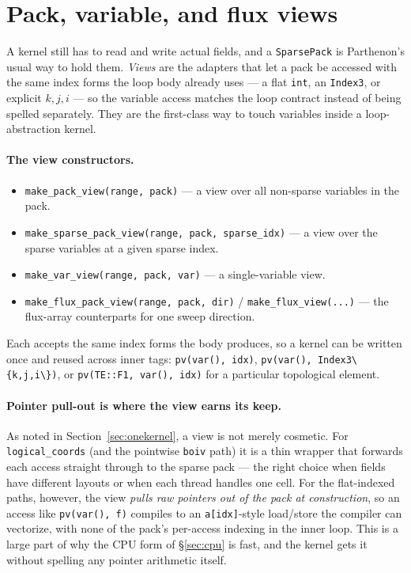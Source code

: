 \documentclass[11pt]{article}
\newcommand{\code}[1]{\lstinline[basicstyle=\ttfamily]|#1|}
\begin{document}
\section{Pack, variable, and flux views}
\label{sec:views}

A kernel still has to read and write actual fields, and a \code{SparsePack} is
Parthenon's usual way to hold them. \emph{Views} are the adapters that let a pack
be accessed with the same index forms the loop body already uses --- a flat
\code{int}, an \code{Index3}, or explicit $k,j,i$ --- so the variable access
matches the loop contract instead of being spelled separately. They are the
first-class way to touch variables inside a loop-abstraction kernel.

\paragraph{The view constructors.}
\begin{itemize}
\item \code{make_pack_view(range, pack)} --- a view over all non-sparse variables
  in the pack.
\item \code{make_sparse_pack_view(range, pack, sparse_idx)} --- a view over the
  sparse variables at a given sparse index.
\item \code{make_var_view(range, pack, var)} --- a single-variable view.
\item \code{make_flux_pack_view(range, pack, dir)} / \code{make_flux_view(...)}
  --- the flux-array counterparts for one sweep direction.
\end{itemize}
Each accepts the same index forms the body produces, so a kernel can be written
once and reused across inner tags: \code{pv(var(), idx)},
\code{pv(var(), Index3\{k,j,i\})}, or \code{pv(TE::F1, var(), idx)} for a
particular topological element.

\paragraph{Pointer pull-out is where the view earns its keep.} As noted in
Section~\ref{sec:onekernel}, a view is not merely cosmetic. For
\code{logical_coords} (and the pointwise \code{boiv} path) it is a thin wrapper
that forwards each access straight through to the sparse pack --- the right choice
when fields have different layouts or when each thread handles one cell. For the
flat-indexed paths, however, the view \emph{pulls raw pointers out of the pack at
construction}, so an access like \code{pv(var(), f)} compiles to an
\code{a[idx]}-style load/store the compiler can vectorize, with none of the pack's
per-access indexing in the inner loop. This is a large part of why the CPU form of
\S\ref{sec:cpu} is fast, and the kernel gets it without spelling any pointer
arithmetic itself.
\end{document}
